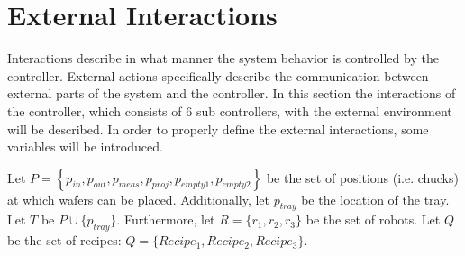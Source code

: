 \section{External Interactions}\label{sec:ext_interactions}
Interactions describe in what manner the system behavior is controlled by the controller.
External actions specifically describe the communication between external parts of the system and the controller.
In this section the interactions of the controller, which consists of $6$ sub controllers, with the external environment will be described.
In order to properly define the external interactions, some variables will be introduced.

Let $P = \left\{p_\mathit{in}, p_\mathit{out}, p_\mathit{meas}, p_\mathit{proj}, p_\mathit{empty1}, p_\mathit{empty2}\right\}$ be the set of positions (i.e. chucks) at which wafers can be placed.
Additionally, let $\mathit{p_\mathit{tray}}$ be the location of the tray.
Let $T$ be $P \cup \{p_\mathit{tray}\}$.
Furthermore, let $R = \{r_1,r_2,r_3\}$ be the set of robots.
Let $Q$ be the set of recipes: $Q = \{Recipe_1, Recipe_2, Recipe_3\}$.


